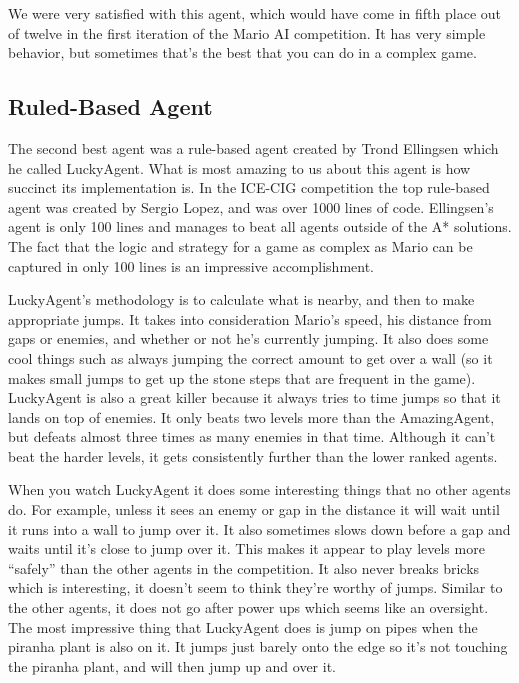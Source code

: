 \documentclass[12pt]{article}
\begin{document}
\begin{multicols*}{2}
We were very satisfied with this agent, which would have come in fifth place out of twelve in the 
first iteration of the Mario AI competition.  It has very simple behavior, but sometimes that's the best 
that you can do in a complex game.

\subsection*{Ruled-Based Agent}
The second best agent was a rule-based agent created by Trond Ellingsen which he called 
LuckyAgent.  What is most amazing to us about this agent is how succinct its implementation is.  
In the ICE-CIG competition the top rule-based agent was created by Sergio Lopez, and was over 
1000 lines of code.  Ellingsen's agent is only 100 lines and manages to beat all agents outside of the 
A* solutions.  The fact that the logic and strategy for a game as complex as Mario can be captured 
in only 100 lines is an impressive accomplishment.

LuckyAgent's methodology is to calculate what is nearby, and then to make appropriate jumps.  It takes 
into consideration Mario's speed, his distance from gaps or enemies, and whether or not he's 
currently jumping.  It also does some cool things such as always jumping the correct amount to 
get over a wall (so it makes small jumps to get up the stone steps that are frequent in the game).  
LuckyAgent is also a great killer because it always tries to time jumps so that it lands 
on top of enemies.  It only beats two levels more than the AmazingAgent, but defeats almost three 
times as many enemies in that time.  Although it can't beat the harder levels, it gets consistently further 
than the lower ranked agents.

When you watch LuckyAgent it does some interesting things that no other agents do.  For example, 
unless it sees an enemy or gap in the distance it will wait until it runs into a wall to jump over it.  
It also sometimes slows down before a gap and waits until it's close to jump over it.  This makes it 
appear to play levels more ``safely'' than the other agents in the competition.  It also never breaks 
bricks which is interesting, it doesn't seem to think they're worthy of jumps.  Similar to the other agents, 
it does not go after power ups which seems like an oversight.  The most impressive thing that 
LuckyAgent does is jump on pipes when the piranha plant is also on it.  It jumps just barely onto the 
edge so it's not touching the piranha plant, and will then jump up and over it.


\end{multicols*}
\end{document}
